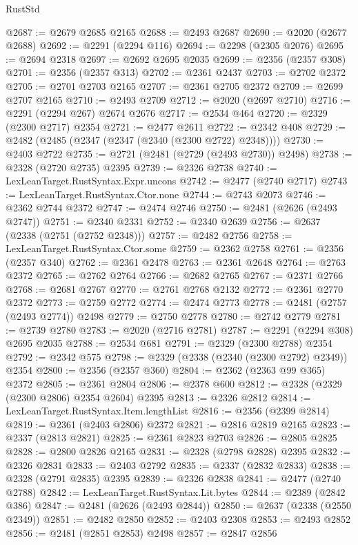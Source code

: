 \begin{lexlean}{RustStd}
\begin{coremodule}
{\begin{coremodule}
{{{{{{{{{{{{{{{{{{{{{{{{{{{{{{{{{{{{{@2687 := @2679 @2685 @2165
@2688 := @2493 @2687
@2690 := @2020 (@2677 @2688)
@2692 := @2291 (@2294 @116)
@2694 := @2298 (@2305 @2076)
@2695 := @2694 @2318
@2697 := @2692 @2695 @2035
@2699 := @2356 (@2357 @308)
@2701 := @2356 (@2357 @313)
@2702 := @2361 @2437
@2703 := @2702 @2372
@2705 := @2701 @2703 @2165
@2707 := @2361 @2705 @2372
@2709 := @2699 @2707 @2165
@2710 := @2493 @2709
@2712 := @2020 (@2697 @2710)
@2716 := @2291 (@2294 @267) @2674 @2676
@2717 := @2534 @464
@2720 := @2329 (@2300 @2717) @2354
@2721 := @2477 @2611
@2722 := @2342 @408
@2729 := @2482 (@2485 (@2347 (@2347 (@2340 (@2300 @2722) @2348))))
@2730 := @2403 @2722
@2735 := @2721 (@2481 (@2729 (@2493 @2730)) @2498)
@2738 := @2328 (@2720 @2735) @2395
@2739 := @2326 @2738
@2740 := LexLeanTarget.RustSyntax.Expr.uncons
@2742 := @2477 (@2740 @2717)
@2743 := LexLeanTarget.RustSyntax.Ctor.none
@2744 := @2743 @2073
@2746 := @2362 @2744 @2372
@2747 := @2474 @2746
@2750 := @2481 (@2626 (@2493 @2747))
@2751 := @2340 @2331
@2752 := @2340 @2639
@2756 := @2637 (@2338 (@2751 (@2752 @2348)))
@2757 := @2482 @2756
@2758 := LexLeanTarget.RustSyntax.Ctor.some
@2759 := @2362 @2758
@2761 := @2356 (@2357 @340)
@2762 := @2361 @2478
@2763 := @2361 @2648
@2764 := @2763 @2372
@2765 := @2762 @2764
@2766 := @2682 @2765
@2767 := @2371 @2766
@2768 := @2681 @2767
@2770 := @2761 @2768 @2132
@2772 := @2361 @2770 @2372
@2773 := @2759 @2772
@2774 := @2474 @2773
@2778 := @2481 (@2757 (@2493 @2774)) @2498
@2779 := @2750 @2778
@2780 := @2742 @2779
@2781 := @2739 @2780
@2783 := @2020 (@2716 @2781)
@2787 := @2291 (@2294 @308) @2695 @2035
@2788 := @2534 @681
@2791 := @2329 (@2300 @2788) @2354
@2792 := @2342 @575
@2798 := @2329 (@2338 (@2340 (@2300 @2792) @2349)) @2354
@2800 := @2356 (@2357 @360)
@2804 := @2362 (@2363 @99 @365) @2372
@2805 := @2361 @2804
@2806 := @2378 @600
@2812 := @2328 (@2329 (@2300 @2806) @2354 @2604) @2395
@2813 := @2326 @2812
@2814 := LexLeanTarget.RustSyntax.Item.lengthList
@2816 := @2356 (@2399 @2814)
@2819 := @2361 (@2403 @2806) @2372
@2821 := @2816 @2819 @2165
@2823 := @2337 (@2813 @2821)
@2825 := @2361 @2823 @2703
@2826 := @2805 @2825
@2828 := @2800 @2826 @2165
@2831 := @2328 (@2798 @2828) @2395
@2832 := @2326 @2831
@2833 := @2403 @2792
@2835 := @2337 (@2832 @2833)
@2838 := @2328 (@2791 @2835) @2395
@2839 := @2326 @2838
@2841 := @2477 (@2740 @2788)
@2842 := LexLeanTarget.RustSyntax.Lit.bytes
@2844 := @2389 (@2842 @386)
@2847 := @2481 (@2626 (@2493 @2844))
@2850 := @2637 (@2338 (@2550 @2349))
@2851 := @2482 @2850
@2852 := @2403 @2308
@2853 := @2493 @2852
@2856 := @2481 (@2851 @2853) @2498
@2857 := @2847 @2856
}}}}}}}}}}}}}}}}}}}}}}}}}}}}}}}}}}}}}
\end{coremodule}}
\end{coremodule}
\end{lexlean}
